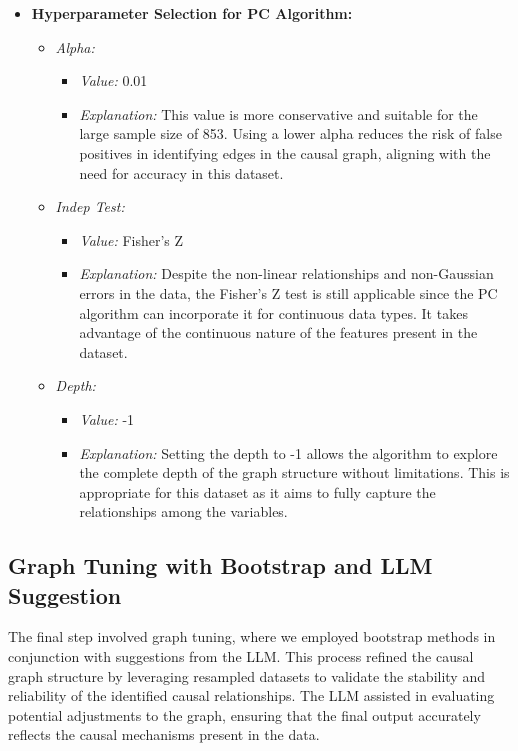 \documentclass{article}
\begin{document}
\begin{itemize}
\item \textbf{Hyperparameter Selection for PC Algorithm:}
  
  \begin{itemize}
  \item \textit{Alpha:} 
    \begin{itemize}
    \item \textit{Value:} 0.01
    \item \textit{Explanation:} This value is more conservative and suitable for the large sample size of 853. Using a lower alpha reduces the risk of false positives in identifying edges in the causal graph, aligning with the need for accuracy in this dataset.
    \end{itemize}

  \item \textit{Indep Test:} 
    \begin{itemize}
    \item \textit{Value:} Fisher's Z
    \item \textit{Explanation:} Despite the non-linear relationships and non-Gaussian errors in the data, the Fisher's Z test is still applicable since the PC algorithm can incorporate it for continuous data types. It takes advantage of the continuous nature of the features present in the dataset.
    \end{itemize}

  \item \textit{Depth:} 
    \begin{itemize}
    \item \textit{Value:} -1
    \item \textit{Explanation:} Setting the depth to -1 allows the algorithm to explore the complete depth of the graph structure without limitations. This is appropriate for this dataset as it aims to fully capture the relationships among the variables.
    \end{itemize}
  \end{itemize}
\end{itemize}

\subsection{Graph Tuning with Bootstrap and LLM Suggestion}
The final step involved graph tuning, where we employed bootstrap methods in conjunction with suggestions from the LLM. This process refined the causal graph structure by leveraging resampled datasets to validate the stability and reliability of the identified causal relationships. The LLM assisted in evaluating potential adjustments to the graph, ensuring that the final output accurately reflects the causal mechanisms present in the data.
\end{document}
